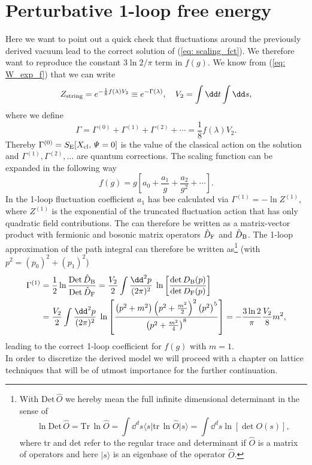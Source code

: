 \section{Perturbative 1-loop free energy}
Here we want to point out a quick check that fluctuations around the previously derived vacuum lead to the correct solution of (\ref{eq: scaling_fct}). We therefore want to reproduce the constant $3\ln 2/\pi$ term in $f(g)$. We know from (\ref{eq: W_exp_f}) that we can write
%
%
\begin{equation}
Z_{\rm string} = e^{-\frac{1}{8}f(\lambda)V_{2}} \equiv e^{-\Gamma(\lambda)}, \quad V_{2}=\int \dd t \int \dd s,
\end{equation}
%
%
where we define
%
%
\begin{equation}
\Gamma = \Gamma^{(0)} + \Gamma^{(1)}+\Gamma^{(2)}+\cdots = \frac{1}{8}f(\lambda)V_{2}.
\end{equation}
%
%
Thereby $\Gamma^{(0)}=S_{\rm E}[X_{\rm cl},\mathit{\Psi}=0]$ is the value of the classical action on the solution and $\Gamma^{(1)},\Gamma^{(2)},\ldots$ are quantum corrections. The scaling function can be expanded in the following way
%
%
\begin{equation}
f(g) = g \left[ a_{0} + \frac{a_{1}}{g} + \frac{a_{2}}{g^{2}} + \cdots \right].
\end{equation}
%
%
In \cite{Giombi:2009gd} the 1-loop fluctuation coefficient $a_{1}$ has bee calculated via $\Gamma^{(1)}=-\ln Z^{(1)}$, where $Z^{(1)}$ is the exponential of the truncated fluctuation action that has only quadratic field contributions. The  can therefore be written as a matrix-vector product with fermionic and bosonic matrix operators $\hat{D}_{\rm F}$ and $\hat{D}_{\rm B}$. The 1-loop approximation of the path integral can therefore be written as\footnote{With $\text{Det}\,\hat{O}$ we hereby mean the full infinite dimensional determinant in the sense of
\begin{equation*}
\ln \text{Det}\,\hat{O} = \text{Tr}\,\ln \hat{O} = \int \dd^{d}s \langle s\vert \text{tr}\,\ln\hat{O} \vert s \rangle
=\int \dd^{d}s \ln[\det O(s) ] ,
\end{equation*}
where tr and det refer to the regular trace and determinant if $\hat{O}$ is a matrix of operators and here $\vert s \rangle$ is an eigenbase of the operator $\hat{O}$.} (with $p^{2} = (p_{0})^{2}+(p_{1})^{2}$)
%
%
\begin{align}
\Gamma^{(1)} &= \frac{1}{2} \ln \frac{\text{Det}\, \hat{D}_{\rm B}}{\text{Det}\,\hat{D}_{\rm F}}
=  \frac{V_{2}}{2} \int \frac{\dd^{2}p}{(2\pi)^{2}} \; \ln \left[\frac{\det D_{\rm B}(p)}{\det D_{\rm F}(p)} \right]
\label{eq: 1_loop}      \\
%
%
&= \frac{V_{2}}{2} \int \frac{\dd^{2}p}{(2\pi)^{2}} \; \ln \left[ \frac{\left(p^{2} +m^{2}\right) \left( p^{2} +\frac{m^{2}}{2}\right)^{2} \left(p^{2}\right)^{5}}{\left( p^{2} + \frac{m^{2}}{4}\right)^{8}} \right]
=-\frac{3 \ln 2}{\pi} \frac{V_{2}}{8}m^{2},   \notag
\end{align}
%
%
leading to the correct 1-loop coefficient for $f(g)$ with $m=1$.\\
In order to discretize the derived model we will proceed with a chapter on lattice techniques that will be of utmost importance for the further continuation.
